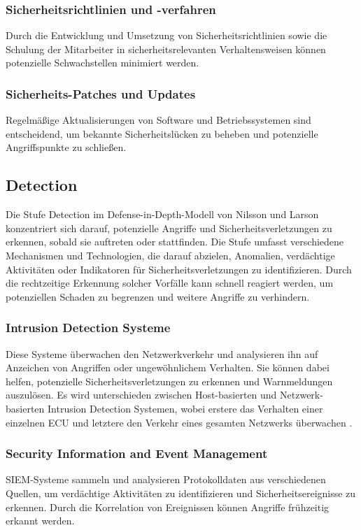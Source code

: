\subsubsection{Sicherheitsrichtlinien und -verfahren}
Durch die Entwicklung und Umsetzung von Sicherheitsrichtlinien sowie die Schulung der Mitarbeiter in sicherheitsrelevanten Verhaltensweisen können potenzielle Schwachstellen minimiert werden.

\subsubsection{Sicherheits-Patches und Updates} 
Regelmäßige Aktualisierungen von Software und Betriebssystemen sind entscheidend, um bekannte Sicherheitslücken zu beheben und potenzielle Angriffspunkte zu schließen.



\subsection{Detection}
Die Stufe Detection im Defense-in-Depth-Modell von Nilsson und Larson konzentriert sich darauf, potenzielle Angriffe und Sicherheitsverletzungen zu erkennen, sobald sie auftreten oder stattfinden.
Die Stufe umfasst verschiedene Mechanismen und Technologien, die darauf abzielen, Anomalien, verdächtige Aktivitäten oder Indikatoren für Sicherheitsverletzungen zu identifizieren. Durch die rechtzeitige Erkennung solcher Vorfälle kann schnell reagiert werden, um potenziellen Schaden zu begrenzen und weitere Angriffe zu verhindern.

\subsubsection{Intrusion Detection Systeme} 
Diese Systeme überwachen den Netzwerkverkehr und analysieren ihn auf Anzeichen von Angriffen oder ungewöhnlichem Verhalten. Sie können dabei helfen, potenzielle Sicherheitsverletzungen zu erkennen und Warnmeldungen auszulösen. Es wird unterschieden zwischen Host-basierten und Netzwerk-basierten Intrusion Detection Systemen, wobei erstere das Verhalten einer einzelnen \acs{ECU} und letztere den Verkehr eines gesamten Netzwerks überwachen \cite[153]{Wurm.2022}.

\subsubsection{Security Information and Event Management} 
SIEM-Systeme sammeln und analysieren Protokolldaten aus verschiedenen Quellen, um verdächtige Aktivitäten zu identifizieren und Sicherheitsereignisse zu erkennen. Durch die Korrelation von Ereignissen können Angriffe frühzeitig erkannt werden.

